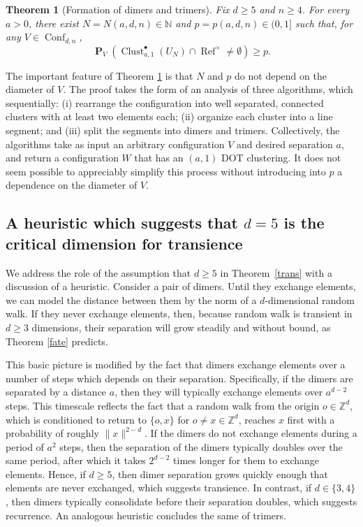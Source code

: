 \documentclass[11pt,reqno]{amsart}
\newtheorem{theorem}{Theorem}
\theoremstyle{definition}
\numberwithin{equation}{section}
\newcommand{\N}{\mathbb{N}}
\newcommand{\Z}{\mathbb{Z}}
\newcommand{\1}{\mathbf{1}}
\DeclareMathOperator{\PP}{\mathbf{P}}
\DeclareMathOperator{\Refcon}{\mathrm{Ref}}
\DeclareMathOperator{\Conf}{\mathrm{Conf}}
\DeclareMathOperator{\Clust}{\mathrm{Clust}}
\begin{document}
\begin{theorem}[Formation of dimers and trimers]\label{thm form dot} Fix $d \geq 5$ and $n \geq 4$. For every $a > 0$, there exist $N = N (a,d,n) \in \N$ and $p = p(a,d,n) \in (0,1]$ such that, for any $V \in \Conf_{d,n}$,
\begin{equation}\label{thm eq form dot}
\PP_{V} \left( \Clust_{a,1}^\bullet (U_N) \cap \Refcon^\times \neq \emptyset \right) \geq p.
\end{equation}
\end{theorem}

The important feature of Theorem \ref{thm form dot} is that $N$ and $p$ do not depend on the diameter of $V$.  The proof takes the form of an analysis of three algorithms, which sequentially: (i) rearrange the configuration into well separated, connected clusters with at least two elements each; (ii) organize each cluster into a line segment; and (iii) split the segments into dimers and trimers. Collectively, the algorithms take as input an arbitrary configuration $V$ and desired separation $a$, and return a configuration $W$ that has an $(a,1)$ DOT clustering. It does not seem possible to appreciably simplify this process without introducing into $p$ a dependence on the diameter of $V$.

\subsection*{A heuristic which suggests that $d=5$ is the critical dimension for transience}\label{sub heuristic}

We address the role of the assumption that $d \geq 5$ in Theorem~\ref{trans} with a discussion of a heuristic. Consider a pair of dimers. Until they exchange elements, we can model the distance between them by the norm of a $d$-dimensional random walk. If they never exchange elements, then, because random walk is transient in $d \geq 3$ dimensions, their separation will grow steadily and without bound, as Theorem \ref{fate} predicts.

This basic picture is modified by the fact that dimers exchange elements over a number of steps which depends on their separation. Specifically, if the dimers are separated by a distance $a$, then they will typically exchange elements over $a^{d-2}$ steps. This timescale reflects the fact that a random walk from the origin $o \in \Z^d$, which is conditioned to return to $\{o,x\}$ for $o \neq x \in \Z^d$, reaches $x$ first with a probability of roughly $\|x\|^{2-d}$. If the dimers do not exchange elements during a period of $a^2$ steps, then the separation of the dimers typically doubles over the same period, after which it takes $2^{d-2}$ times longer for them to exchange elements. Hence, if $d \geq 5$, then dimer separation grows quickly enough that elements are never exchanged, which suggests transience. In contrast, if $d \in \{3,4\}$, then dimers typically consolidate before their separation doubles, which suggests recurrence. An analogous heuristic concludes the same of trimers. 
\end{document}
